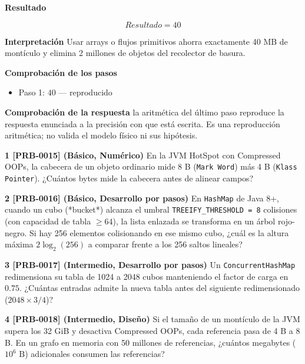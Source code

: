 \documentclass{book}
\begin{document}
\begin{tcolorbox}[title={Problema resuelto}, studiumworked, breakable]
\noindent\textbf{Resultado}

\[
Resultado = 40
\]

\noindent\textbf{Interpretación}
Usar arrays o flujos primitivos ahorra exactamente 40 MB de montículo y elimina 2 millones de objetos del recolector de basura.

\noindent\textbf{Comprobación de los pasos}
\begin{itemize}
\item Paso 1: $40$ — reproducido
\end{itemize}

\noindent\textbf{Comprobación de la respuesta} la aritmética del último paso reproduce la respuesta enunciada a la precisión con que está escrita. Es una reproducción aritmética; no valida el modelo físico ni sus hipótesis.
\end{tcolorbox}

\begin{tcolorbox}[title={Ejercicios}, studiumworked, breakable]

\noindent\textbf{1 [PRB-0015] (Básico, Numérico)}
En la JVM HotSpot con Compressed OOPs, la cabecera de un objeto ordinario mide 8 B (\texttt{Mark Word}) más 4 B (\texttt{Klass Pointer}). ¿Cuántos bytes mide la cabecera antes de alinear campos?

\noindent\textbf{2 [PRB-0016] (Básico, Desarrollo por pasos)}
En \texttt{HashMap} de Java 8+, cuando un cubo (*bucket*) alcanza el umbral \texttt{TREEIFY\_THRESHOLD = 8} colisiones (con capacidad de tabla \(\ge 64\)), la lista enlazada se transforma en un árbol rojo-negro. Si hay 256 elementos colisionando en ese mismo cubo, ¿cuál es la altura máxima \(2 \log_2(256)\) a comparar frente a los 256 saltos lineales?

\noindent\textbf{3 [PRB-0017] (Intermedio, Desarrollo por pasos)}
Un \texttt{ConcurrentHashMap} redimensiona su tabla de 1024 a 2048 cubos manteniendo el factor de carga en \(0.75\). ¿Cuántas entradas admite la nueva tabla antes del siguiente redimensionado (\(2048 \times 3 / 4\))?

\noindent\textbf{4 [PRB-0018] (Intermedio, Diseño)}
Si el tamaño de un montículo de la JVM supera los 32 GiB y desactiva Compressed OOPs, cada referencia pasa de 4 B a 8 B. En un grafo en memoria con 50 millones de referencias, ¿cuántos megabytes (\(10^6\text{ B}\)) adicionales consumen las referencias?
\end{tcolorbox}
\end{document}
